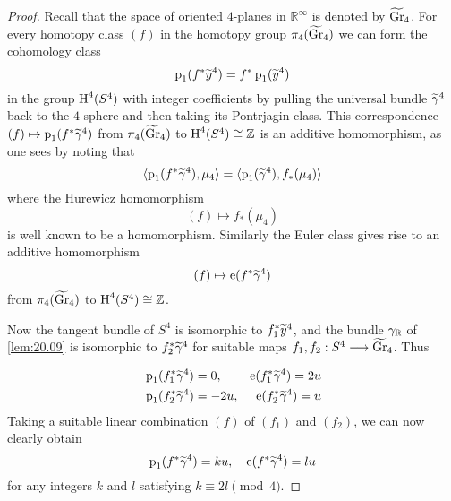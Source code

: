 \documentclass[../main]{subfiles}
\begin{document}
\begin{proof} Recall that the space of oriented $4$-planes in $\mathbb{R}^{\infty}$ is denoted by $\xtilde{\grassmannian}_{4}$. For every homotopy class $(f)$ in the homotopy group $\pi_{4}(\xtilde{\grassmannian}_{4})$ we can form the cohomology class
\[
\pontrjaginclass_{1}(f^{*} \xtilde{y}^{4})=f^{*} \pontrjaginclass_{1}(\xtilde{y}^{4})
\]
in the group $\operatorname{H}^{4}(S^{4})$ with integer coefficients by pulling the universal bundle $\xtilde{\tautological}^{4}$ back to the $4$-sphere and then taking its Pontrjagin class. This correspondence $(f) \mapsto \pontrjaginclass_{1}(f^{*} \xtilde{\tautological}^{4})$ from $\pi_{4}(\xtilde{\grassmannian}_{4})$ to $\operatorname{H}^{4}(S^{4}) \cong \mathbb{Z}$ is an additive homomorphism, as one sees by noting that
\[
\langle\pontrjaginclass_{1}(f^{*} \xtilde{\tautological}^{4}), \mu_{4}\rangle=\langle\pontrjaginclass_{1}(\xtilde{\tautological}^{4}), f_{*}(\mu_{4})\rangle
\]
where the Hurewicz homomorphism
\[
(f)  \mapsto f_{*}(\mu_{4})
\]
is well known to be a homomorphism. Similarly the Euler class gives rise to an additive homomorphism
\[
(f) \mapsto \eulerclass(f^{*} \xtilde{\tautological}^{4})
\]
from $\pi_{4}(\xtilde{\grassmannian}_{4})$ to $\operatorname{H}^{4}(S^{4}) \cong \mathbb{Z}$.

Now the tangent bundle of $S^{4}$ is isomorphic to $f_{1}^{*} \xtilde{y}^{4}$, and the bundle $\gamma_{\mathbb{R}}$ of \ref{lem:20.09} is isomorphic to $f_{2}^{*} \xtilde{\tautological}^{4}$ for suitable maps $f_{1}, f_{2}: S^{4} \varrightarrow{} \xtilde{\grassmannian}_{4}$. Thus
\[
\begin{aligned}
&\pontrjaginclass_{1}(f_{1}^{*} \xtilde{\tautological}^{4})=0, & \eulerclass(f_{1}^{*} \xtilde{\tautological}^{4})=2 u& \\
&\pontrjaginclass_{1}(f_{2}^{*} \xtilde{\tautological}^{4})=-2 u, & \eulerclass(f_{2}^{*} \xtilde{\tautological}^{4})=u&
\end{aligned}
\]
Taking a suitable linear combination $(f)$ of $(f_{1})$ and $(f_{2})$, we can now clearly obtain
\[
\pontrjaginclass_{1}(f^{*} \xtilde{\tautological}^{4})=ku, \quad \eulerclass(f^{*} \xtilde{\tautological}^{4})=lu
\]
for any integers $k$ and $l$ satisfying $k \equiv 2 l\pmod 4$. 

\end{proof}
\end{document}

